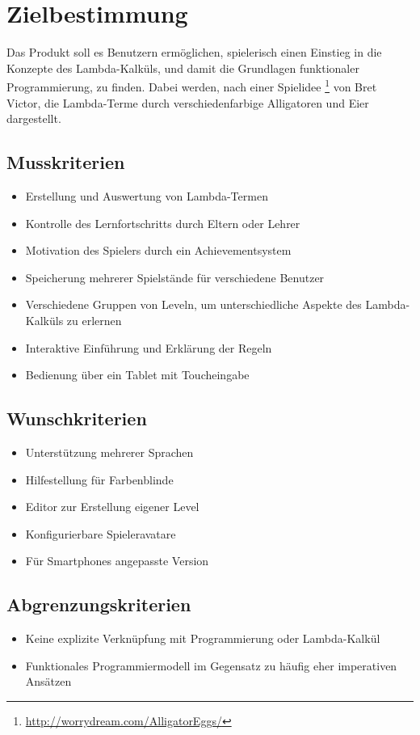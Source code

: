 \section{Zielbestimmung}
Das Produkt soll es Benutzern ermöglichen, spielerisch einen Einstieg in die Konzepte des Lambda-Kalküls, und damit die Grundlagen funktionaler Programmierung, zu finden.
Dabei werden, nach einer Spielidee \footnote{\url{http://worrydream.com/AlligatorEggs/}} von Bret Victor, die Lambda-Terme durch verschiedenfarbige Alligatoren und Eier dargestellt.


\subsection{Musskriterien}

\begin{itemize}
	\item Erstellung und Auswertung von Lambda-Termen
	\item Kontrolle des Lernfortschritts durch Eltern oder Lehrer
	\item Motivation des Spielers durch ein Achievementsystem
	\item Speicherung mehrerer Spielstände für verschiedene Benutzer
	\item Verschiedene Gruppen von Leveln, um unterschiedliche Aspekte des Lambda-Kalküls zu erlernen
	\item Interaktive Einführung und Erklärung der Regeln
	\item Bedienung über ein Tablet mit Toucheingabe
\end{itemize}


\subsection{Wunschkriterien}

\begin{itemize}
	\item Unterstützung mehrerer Sprachen
	\item Hilfestellung für Farbenblinde
	\item Editor zur Erstellung eigener Level
	\item Konfigurierbare Spieleravatare
	\item Für Smartphones angepasste Version
\end{itemize}


\subsection{Abgrenzungskriterien}

\begin{itemize}
	\item Keine explizite Verknüpfung mit Programmierung oder Lambda-Kalkül
	\item Funktionales Programmiermodell im Gegensatz zu häufig eher imperativen Ansätzen
\end{itemize}
